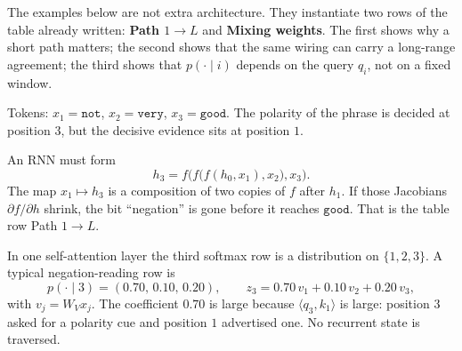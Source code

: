 \documentclass[11pt,a4paper]{article}
\theoremstyle{definition}
\begin{document}
The examples below are not extra architecture. They instantiate two rows of the table already written: \textbf{Path \(1\to L\)} and \textbf{Mixing weights}. The first shows why a short path matters; the second shows that the same wiring can carry a long-range agreement; the third shows that \(p(\cdot\mid i)\) depends on the query \(q_i\), not on a fixed window.

\begin{example}[Negation: path length, \(L=3\)]
\label{ex:spr2025-nlp-not-good}
Tokens: \(x_1=\texttt{not}\), \(x_2=\texttt{very}\), \(x_3=\texttt{good}\). The polarity of the phrase is decided at position \(3\), but the decisive evidence sits at position \(1\).

An RNN must form
\[
h_3=f\bigl(f\bigl(f(h_0,x_1),x_2\bigr),x_3\bigr).
\]
The map \(x_1\mapsto h_3\) is a composition of two copies of \(f\) after \(h_1\). If those Jacobians \(\partial f/\partial h\) shrink, the bit ``negation'' is gone before it reaches \(\texttt{good}\). That is the table row Path \(1\to L\).

In one self-attention layer the third softmax row is a distribution on \(\{1,2,3\}\). A typical negation-reading row is
\[
p(\cdot\mid 3)=(0.70,\,0.10,\,0.20),
\qquad
z_3=0.70\,v_1+0.10\,v_2+0.20\,v_3,
\]
with \(v_j=W_V x_j\). The coefficient \(0.70\) is large because \(\langle q_3,k_1\rangle\) is large: position \(3\) asked for a polarity cue and position \(1\) advertised one. No recurrent state is traversed.

\begin{center}
\end{center}
\end{example}
\end{document}
